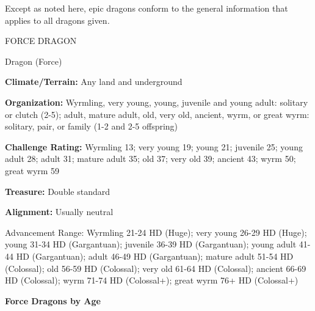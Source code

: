 \documentclass{article}
\begin{document}
\vspace{12pt}
Except as noted here, epic dragons conform to the general information that applies 
to all dragons given\textit{.}

\vspace{12pt}
FORCE DRAGON 

Dragon (Force) 

\textbf{Climate/Terrain:} Any land and underground 

\textbf{Organization:} Wyrmling, very young, young, juvenile and young adult: solitary 
or clutch (2-5); adult, mature adult, old, very old, ancient, wyrm, or great wyrm: 
solitary, pair, or family (1-2 and 2-5 offspring) 

\textbf{Challenge Rating:} Wyrmling 13; very young 19; young 21; juvenile 25; young 
adult 28; adult 31; mature adult 35; old 37; very old 39; ancient 43; wyrm 50; 
great wyrm 59 

\textbf{Treasure:} Double standard 

\textbf{Alignment:} Usually neutral 

Advancement Range: Wyrmling 21-24 HD (Huge); very young 26-29 HD (Huge); young 
31-34 HD (Gargantuan); juvenile 36-39 HD (Gargantuan); young adult 41-44 HD (Gargantuan); 
adult 46-49 HD (Gargantuan); mature adult 51-54 HD (Colossal); old 56-59 HD (Colossal); 
very old 61-64 HD (Colossal); ancient 66-69 HD (Colossal); wyrm 71-74 HD (Colossal+); 
great wyrm 76+ HD (Colossal+) 

\vspace{12pt}
\textbf{Force Dragons by Age }
\end{document}
